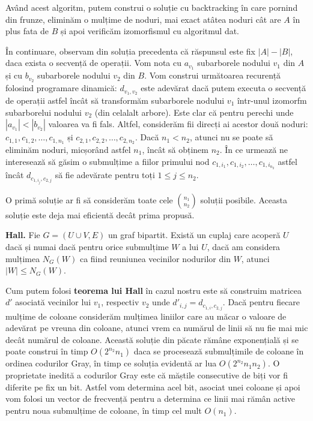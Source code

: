 Având acest algoritm, putem construi o soluție cu backtracking în care pornind din frunze, eliminăm o mulțime de noduri, mai exact atâtea
noduri cât are $A$ în plus fata de $B$ și apoi verificăm izomorfismul cu algoritmul dat.

În continuare, observam din soluția precedenta că răspunsul este fix $|A| - |B|$, daca exista o secvență de operații. Vom nota cu $a_{v_{1}}$
subarborele nodului $v_{1}$ din $A$ și cu $b_{v_{2}}$ subarborele nodului $v_{2}$ din $B$. Vom construi următoarea recurență folosind
programare dinamică: $d_{v_{1}, v_{2}}$ este adevărat dacă putem executa o secvență de operații astfel încât să transformăm subarborele
nodului $v_{1}$ într-unul izomorfm subarborelui nodului $v_{2}$ (din celalalt arbore). Este clar că pentru perechi unde $|a_{v_{1}}| < |b_{v_{2}}|$ valoarea va fi fals. Altfel, considerăm fii direcți ai acestor două noduri: $c_{1, 1}, c_{1, 2}, \ldots, c_{1, n_{1}}$ și $c_{2, 1}, c_{2, 2}, \ldots, c_{2, n_{2}}$.
Dacă $n_{1} < n_{2}$, atunci nu se poate să eliminăm noduri, micșorând astfel $n_{1}$, încât să obținem $n_{2}$. În ce urmează ne interesează să găsim o
submulțime a fiilor primului nod $c_{1, i_{1}}, c_{1, i_{2}}, \ldots, c_{1, i_{n_{2}}}$ astfel încât $d_{c_{1, i_{j}}, c_{2, j}}$ să fie adevărate
pentru toți $1 \leq j \leq n_{2}$.

O primă soluție ar fi să considerăm toate cele $\binom{n_{1}}{n_{2}}$ soluții posibile. Aceasta soluție este deja mai eficientă decât prima propusă.

\begin{thm}
  \label{hall}
  \textbf{Hall.} Fie $G = (U \cup V, E)$ un graf bipartit. Există un cuplaj care acoperă $U$ dacă și numai dacă pentru orice submulțime $W$
  a lui $U$, dacă am considera mulțimea $N_{G}(W)$ ca fiind reuniunea vecinilor nodurilor din $W$, atunci $|W| \leq N_{G}(W)$.
\end{thm}

Cum putem folosi \textbf{teorema lui Hall} în cazul nostru este să construim matricea $d'$ asociată vecinilor lui $v_{1}$, respectiv $v_{2}$
unde $d'_{i, j} = d_{c_{1, i}, c_{2, j}}$. Dacă pentru fiecare mulțime de coloane considerăm mulțimea liniilor care au măcar o valoare de adevărat
pe vreuna din coloane, atunci vrem ca numărul de linii să nu fie mai mic decât numărul de coloane. Această soluție din păcate rămâne exponențială
și se poate construi în timp $O(2^{n_{2}} n_{1})$ daca se procesează submulțimile de coloane în ordinea codurilor Gray, în timp ce soluția evidentă ar lua
$O(2^{n_{2}} n_{1}n_{2})$. O proprietate inedită a codurilor Gray este că măștile consecutive de biți vor fi diferite pe fix un bit. Astfel vom determina acel bit,
asociat unei coloane și apoi vom folosi un vector de frecvență pentru a determina ce linii mai rămân active pentru noua submulțime de coloane, în timp
cel mult $O(n_{1})$.

